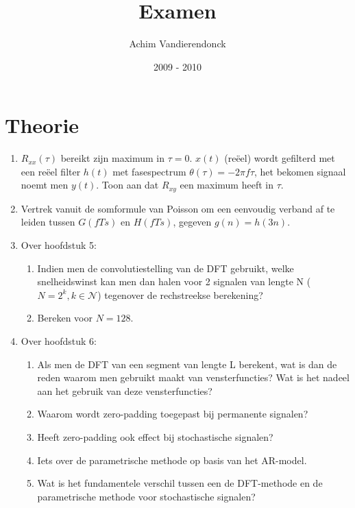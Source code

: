\documentclass[a4paper]{article}
\title{Examen}
\author{Achim Vandierendonck}
\date{2009 - 2010}
\begin{document}
\maketitle

\section{Theorie}
\begin{enumerate}
    \item $R_{xx}(\tau)$ bereikt zijn maximum in $\tau = 0$. $x(t)$ (reëel) wordt gefilterd met een reëel filter $h(t)$ met fasespectrum $\theta(\tau) = -2\pi f\tau$, het bekomen signaal noemt men $y(t)$. Toon aan dat $R_{xy}$ een maximum heeft in $\tau$.
    \item Vertrek vanuit de somformule van Poisson om een eenvoudig verband af te leiden tussen $G(fTs)$ en $H(fTs)$, gegeven $g(n) = h(3n)$.
    \item Over hoofdstuk 5: 
        \begin{enumerate}
            \item Indien men de convolutiestelling van de DFT gebruikt, welke snelheidswinst kan men dan halen voor 2 signalen van lengte N ($N=2^k, k\in\mathcal{N}$) tegenover de rechstreekse berekening?
            \item Bereken voor $N=128$.
        \end{enumerate}
    \item Over hoofdstuk 6:
        \begin{enumerate}
            \item Als men de DFT van een segment van lengte L berekent, wat is dan de reden waarom men gebruikt maakt van vensterfuncties? Wat is het nadeel aan het gebruik van deze vensterfuncties? 
            \item Waarom wordt zero-padding toegepast bij permanente signalen?
            \item Heeft zero-padding ook effect bij stochastische signalen?
            \item Iets over de parametrische methode op basis van het AR-model. 
            \item Wat is het fundamentele verschil tussen een de DFT-methode en de parametrische methode voor stochastische signalen?
        \end{enumerate}
\end{enumerate}
\end{document}
